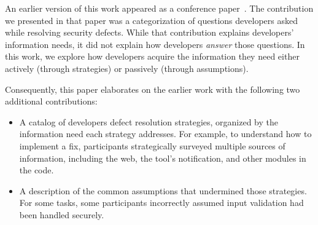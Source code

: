 \documentclass[10pt,journal,compsoc]{IEEEtran}
\begin{document}
%
%
%
%

An earlier version of this work appeared as a conference paper~\cite{Smith2015Questions}. 
The contribution we presented in that paper was a categorization of questions developers asked while resolving security defects.
While that contribution explains developers' information needs, it did not explain how developers \textit{answer} those questions.
In this work, we explore how developers acquire the information they need either actively (through strategies) or passively (through assumptions).


Consequently, this paper elaborates on the earlier work with the following two additional contributions:

\begin{itemize}
	\item A catalog of developers defect resolution strategies, organized by the information need each strategy addresses. 
	For example, to understand how to implement a fix, participants strategically surveyed multiple sources of information, including the web, the tool's notification, and other modules in the code.
	\item A description of the common assumptions that undermined those strategies. 
	For some tasks, some participants incorrectly assumed input validation had been handled securely.
\end{itemize}
\end{document}
